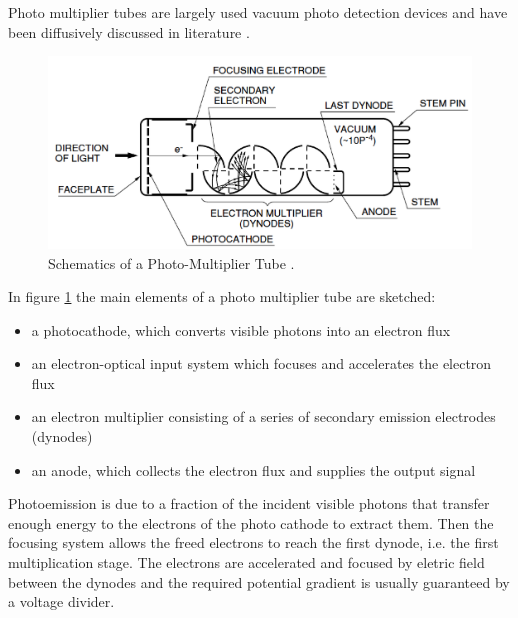 Photo multiplier tubes are largely used vacuum photo detection devices and have been diffusively discussed in literature \cite{Knoll2000}. 
\begin{figure}[htbp]
\begin{center}
\includegraphics[width=12cm]{../Pictures/Chapter_3/PMT.png}
\end{center}
\caption[PMT schematics]{Schematics of a Photo-Multiplier Tube \cite{Hama2006}.}
\label{fig:PMT_schematics}
\end{figure}
In figure \ref{fig:PMT_schematics} the main elements of a photo multiplier tube are sketched:
\begin{itemize}
\item a photocathode, which converts visible photons into an electron flux
\item an electron-optical input system which focuses and accelerates the electron flux
\item an electron multiplier consisting of a series of secondary emission electrodes (dynodes)
\item an anode, which collects the electron flux and supplies the output signal
\end{itemize}
Photoemission is due to a fraction of the incident visible photons that transfer enough energy to the electrons of the photo cathode to extract them.
Then the focusing system allows the freed electrons to reach the first dynode, i.e. the first multiplication stage. The electrons are accelerated and focused by eletric field between the dynodes and the required potential gradient is usually guaranteed by a voltage divider.


